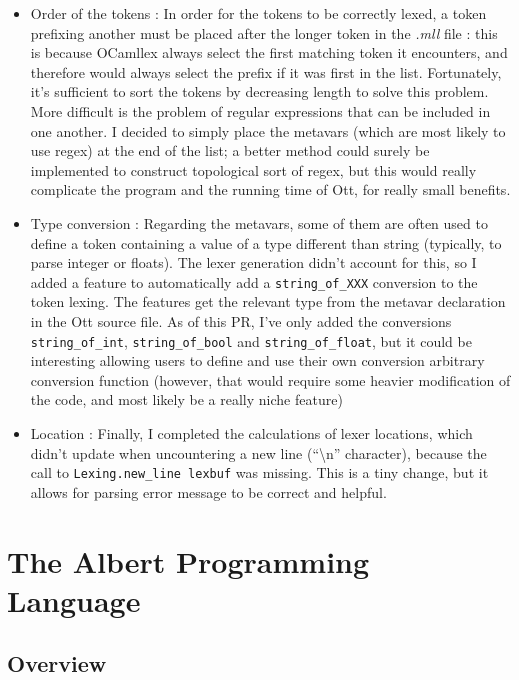 \documentclass{report}
\begin{document}
\begin{itemize}
\item Order of the tokens : In order for the tokens to be correctly lexed, a token prefixing another must be placed after the longer token in the \textit{.mll} file : this is because OCamllex always select the first matching token it encounters, and therefore would always select the prefix if it was first in the list. Fortunately, it's sufficient to sort the tokens by decreasing length to solve this problem. More difficult is the problem of regular expressions that can be included in one another. I decided to simply place the metavars (which are most likely to use regex) at the end of the list; a better method could surely be implemented to construct topological sort of regex, but this would really complicate the program and the running time of Ott, for really small benefits.
\item Type conversion : Regarding the metavars, some of them are often used to define a token containing a value of a type different than string (typically, to parse integer or floats). The lexer generation didn't account for this, so I added a feature to automatically add a \texttt{string\_of\_XXX} conversion to the token lexing. The features get the relevant type from the metavar declaration in the Ott source file. As of this PR, I've only added the conversions \texttt{string\_of\_int}, \texttt{string\_of\_bool} and \texttt{string\_of\_float}, but it could be interesting allowing users to define and use their own conversion arbitrary conversion function (however, that would require some heavier modification of the code, and most likely be a really niche feature)
\item Location : Finally, I completed the calculations of lexer locations, which didn't update when uncountering a new line (``\textbackslash n'' character), because the call to \texttt{Lexing.new\_line lexbuf} was missing. This is a tiny change, but it allows for parsing error message to be correct and helpful.
\end{itemize}

\chapter{The Albert Programming Language}

\section{Overview}
\end{document}
